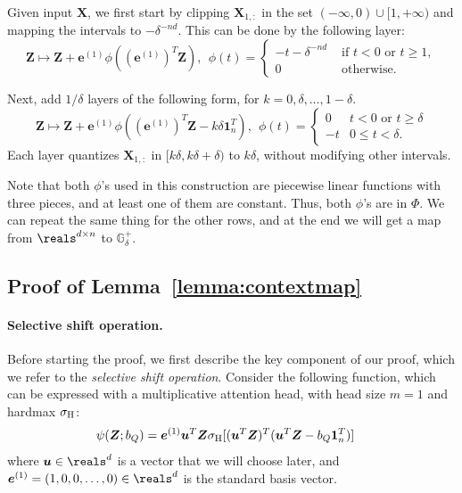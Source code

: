\documentclass{article} %
\def\vone{{\bm{1}}}
\def\ve{{\bm{e}}}
\def\vu{{\bm{u}}}
\def\mX{{\bm{X}}}
\def\mZ{{\bm{Z}}}
\def\sG{{\mathbb{G}}}
\newcommand{\hdmx}{\sigma_{\rm H}}
\begin{document}
Given input $\mX$, we first start by clipping $\mX_{1,:}$ in the set $(-\infty, 0) \cup [1, +\infty)$ and mapping the intervals to $-\delta^{-nd}$. This can be done by the following layer:
\begin{equation*}
    \mZ \mapsto \mZ + \ve^{(1)} \phi( (\ve^{(1)})^T \mZ ),
    ~~
    \phi(t) = 
    \begin{cases}
        -t - \delta^{-nd} & \text{ if } t < 0 \text{ or } t \geq 1,\\
        0 & \text{ otherwise.}
    \end{cases}
\end{equation*}

Next, add $1/\delta$ layers of the following form, for $k = 0, \delta, \dots, 1-\delta$.
\begin{equation*}
    \mZ \mapsto \mZ + \ve^{(1)} \phi( (\ve^{(1)})^T \mZ - k\delta \vone_n^T),
    ~~
    \phi(t) = 
    \begin{cases}
    0 & t < 0 \text{ or } t \geq \delta\\
    -t & 0 \leq t < \delta.
    \end{cases}
\end{equation*}
Each layer quantizes $\mX_{1,:}$ in $[k\delta, k\delta+\delta)$ to $k\delta$, without modifying other intervals.

Note that both $\phi$'s used in this construction are piecewise linear functions with three pieces, and at least one of them are constant. Thus, both $\phi$'s are in $\Phi$. We can repeat the same thing for the other rows, and at the end we will get a map from $\reals^{d \times n}$ to $\sG^+_{\delta}$.


\subsection{Proof of Lemma~\ref{lemma:contextmap}}
\label{sec:proof-contextmap}

\paragraph{Selective shift operation.}
Before starting the proof, we first describe the key component of our proof, which we refer to the \emph{selective shift operation}.
Consider the following function, which can be expressed with a multiplicative attention head, with head size $m = 1$ and hardmax $\hdmx$:
\begin{align*}
    \psi(\mZ; b_Q) &= \ve^{(1)} \vu^T \mZ \hdmx [ (\vu^T \mZ)^T (\vu^T \mZ - b_Q \vone_n^T) ]
\end{align*}
where $\vu \in \reals^d$ is a vector that we will choose later, and $\ve^{(1)} = (1, 0, 0, \dots, 0) \in \reals^d$ is the standard basis vector.
\end{document}
